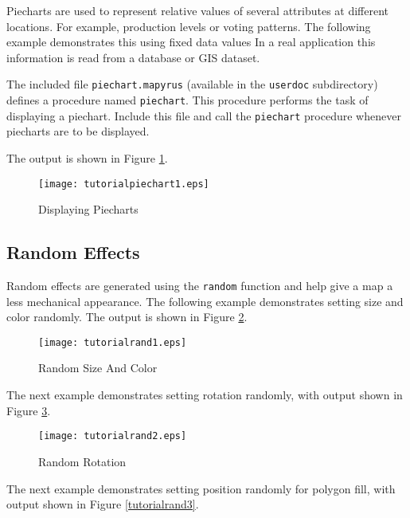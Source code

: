 Piecharts are used to represent relative values of several attributes at
different locations.  For example, production levels or voting patterns.  The
following example demonstrates this using fixed data values
In a real application this information is read from a
database or GIS dataset.

The included file \texttt{piechart.mapyrus} (available in the \texttt{userdoc}
subdirectory) defines a procedure named \texttt{piechart}.  This procedure
performs the task of displaying a piechart.  Include this file and call the
\texttt{piechart} procedure whenever piecharts are to be displayed.

The output is shown in Figure \ref{tutorialpiechart1}.



\begin{figure}[htb]
\texttt{[image: tutorialpiechart1.eps]}
\caption{Displaying Piecharts}
\label{tutorialpiechart1}
\end{figure}

\subsection{Random Effects}

Random effects are generated using the \texttt{random}
function and help give a map a less mechanical appearance.
The following example demonstrates setting size and color randomly.
The output is shown in Figure \ref{tutorialrand1}.



\begin{figure}[htb]
\texttt{[image: tutorialrand1.eps]}
\caption{Random Size And Color}
\label{tutorialrand1}
\end{figure}

The next example demonstrates setting rotation randomly, with output shown in
Figure \ref{tutorialrand2}.



\begin{figure}[htb]
\texttt{[image: tutorialrand2.eps]}
\caption{Random Rotation}
\label{tutorialrand2}
\end{figure}

The next example demonstrates setting position randomly for polygon fill, with
output shown in Figure \ref{tutorialrand3}.



